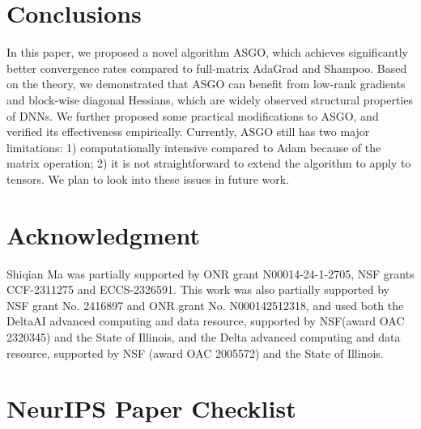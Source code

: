 \documentclass{article}
\theoremstyle{remark}
\begin{document}
\section{Conclusions}
In this paper, we proposed a novel algorithm ASGO, which achieves significantly better convergence rates compared to full-matrix AdaGrad and Shampoo. Based on the theory, we demonstrated that ASGO can benefit from low-rank gradients and block-wise diagonal Hessians, which are widely observed structural properties of DNNs. We further proposed some practical modifications to ASGO, and verified its effectiveness empirically. Currently, ASGO still has two major limitations: 1) computationally intensive compared to Adam because of the matrix operation; 2) it is not straightforward to extend the algorithm to apply to tensors. We plan to look into these issues in future work.

\newpage

\section*{Acknowledgment}
{Shiqian Ma was partially supported by ONR grant N00014-24-1-2705, NSF grants CCF-2311275 and ECCS-2326591}. This work was also partially supported by NSF grant No. 2416897 and ONR grant No. N000142512318,
and used both the DeltaAI advanced computing and data resource, supported by 
NSF(award OAC 2320345) and the State of Illinois, and the Delta advanced computing and data resource, 
supported by 
NSF
(award OAC 2005572) and the State of Illinois. 







\section*{NeurIPS Paper Checklist}


\end{document}
